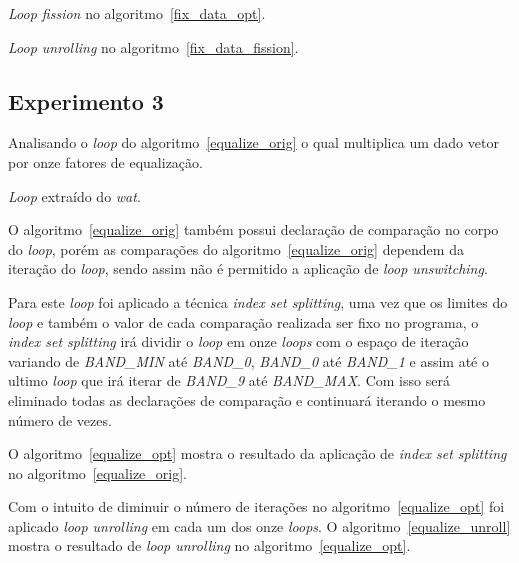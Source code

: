 \begin{algorithm}[H]
  \caption{\textit{Loop fission} no algoritmo~\ref{fix_data_opt}.}
    \label{fix_data_fission}

\end{algorithm}

\begin{algorithm}[H]
  \caption{\textit{Loop unrolling} no algoritmo~\ref{fix_data_fission}.}
    \label{fix_data_unrofis}

\end{algorithm}

\subsection{Experimento 3}

Analisando o \textit{loop} do algoritmo~\ref{equalize_orig} o qual multiplica um dado 
vetor por onze fatores de equalização.

\begin{algorithm}[H]
  \caption{\textit{Loop} extraído do \textit{wat}.}
\label{equalize_orig}

\end{algorithm}

O algoritmo~\ref{equalize_orig} também possui declaração de comparação no corpo do
\textit{loop}, porém as comparações do algoritmo~\ref{equalize_orig} dependem da
iteração do \textit{loop}, sendo assim não é permitido a aplicação de
\textit{loop unswitching}.

Para este \textit{loop} foi aplicado a técnica \textit{index set
splitting}, uma vez que os limites do \textit{loop} e também o valor de cada
comparação realizada ser fixo no programa, o \textit{index set splitting} irá
dividir o \textit{loop} em onze \textit{loops} com o espaço de iteração variando
de \textit{BAND\_MIN} até \textit{BAND\_0}, \textit{BAND\_0} até \textit{BAND\_1} e
assim até o ultimo \textit{loop} que irá iterar de \textit{BAND\_9} até
\textit{BAND\_MAX}. Com isso será eliminado todas as declarações de comparação e
continuará iterando o mesmo número de vezes.

O algoritmo~\ref{equalize_opt} mostra o resultado da aplicação de 
\textit{index set splitting} no algoritmo~\ref{equalize_orig}.

Com o intuito de diminuir o número de iterações no algoritmo~\ref{equalize_opt}
foi aplicado \textit{loop unrolling} em cada um dos onze \textit{loops}. 
O algoritmo~\ref{equalize_unroll} mostra o resultado de \textit{loop unrolling}
no algoritmo~\ref{equalize_opt}.

